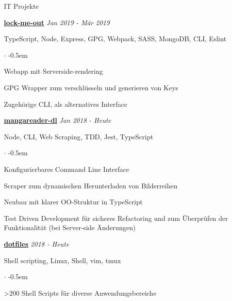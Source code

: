 \documentclass{cv}
\begin{document}
\begin{rSection}{IT Projekte}


  \textbf{\href{https://github.com/jneidel/lock-me-out}{lock-me-out}}
  \hfill
  {\em Jan 2019 - Mär 2019}

  TypeScript, Node, Express, GPG, Webpack, SASS, MongoDB, CLI, Eslint
  \begin{list}{$\cdot$}{}
    \itemsep -0.5em \vspace{-0.5em}
    \smallskip
    \item Webapp mit Serverside-rendering
    \item GPG Wrapper zum verschlüsseln und generieren von Keys
    \item Zugehörige CLI, als alternatives Interface
  \end{list}

  \textbf{\href{https://github.com/jneidel/mangareader-dl}{mangareader-dl}}
  \hfill
  {\em Jan 2018 - Heute}

  Node, CLI, Web Scraping, TDD, Jest, TypeScript
  \begin{list}{$\cdot$}{}
    \itemsep -0.5em \vspace{-0.5em}
    \smallskip
    \item Konfigurierbares Command Line Interface
    \item Scraper zum dynamischen Herunterladen von Bilderreihen
    \item Neubau mit klarer OO-Struktur in TypeScript
    \item Test Driven Development für sicheres Refactoring und zum Überprüfen der
  Funktionalität (bei Server-side Änderungen)
  \end{list}

  \textbf{\href{https://github.com/jneidel/dotfiles}{dotfiles}}
  \hfill
  {\em 2018 - Heute}

  Shell scripting, Linux, Shell, vim, tmux
  \begin{list}{$\cdot$}{}
    \itemsep -0.5em \vspace{-0.5em}
    \smallskip
    \item \textgreater200 Shell Scripts für diverse Anwendungsbereiche
  \end{list}


\end{rSection}
\end{document}
